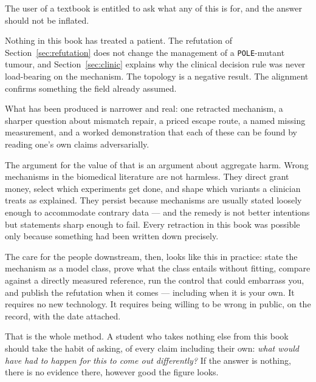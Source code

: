 The user of a textbook is entitled to ask what any of this is for, and the
answer should not be inflated.

Nothing in this book has treated a patient. The refutation of
Section~\ref{sec:refutation} does not change the management of a
\texttt{POLE}-mutant tumour, and Section~\ref{sec:clinic} explains why the
clinical decision rule was never load-bearing on the mechanism. The topology is a
negative result. The alignment confirms something the field already assumed.

What has been produced is narrower and real: one retracted mechanism, a sharper
question about mismatch repair, a priced escape route, a named missing
measurement, and a worked demonstration that each of these can be found by
reading one's own claims adversarially.

The argument for the value of that is an argument about aggregate harm. Wrong
mechanisms in the biomedical literature are not harmless. They direct grant
money, select which experiments get done, and shape which variants a clinician
treats as explained. They persist because mechanisms are usually stated loosely
enough to accommodate contrary data --- and the remedy is not better intentions
but statements sharp enough to fail. Every retraction in this book was possible
only because something had been written down precisely.

The care for the people downstream, then, looks like this in practice: state the
mechanism as a model class, prove what the class entails without fitting,
compare against a directly measured reference, run the control that could
embarrass you, and publish the refutation when it comes --- including when it is
your own. It requires no new technology. It requires being willing to be wrong in
public, on the record, with the date attached.

That is the whole method. A student who takes nothing else from this book should
take the habit of asking, of every claim including their own: \emph{what would
have had to happen for this to come out differently?} If the answer is nothing,
there is no evidence there, however good the figure looks.

